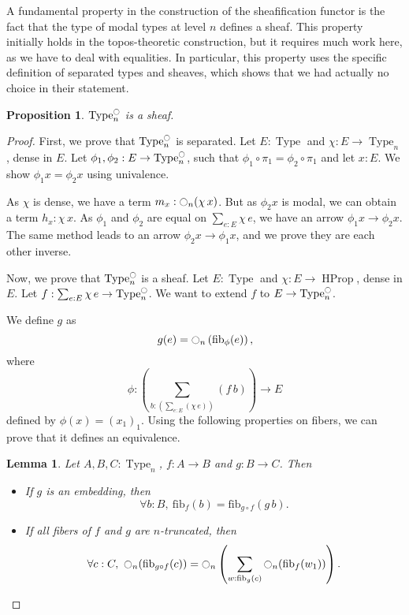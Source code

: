 \documentclass[conference]{IEEEtran}
\newtheorem{prop}[thm]{Proposition}
\newtheorem{lem}[thm]{Lemma}
\DeclareMathOperator{\Type}{Type}
\DeclareMathOperator{\HProp}{HProp}
\newcommand{\modal}{\ensuremath{\ocircle}}
\newcommand \fib[2] {\mathrm{fib}_{#1}(#2)}
\begin{document}
A fundamental property in the construction of the sheafification
functor is the fact that the type of modal types at level $n$ defines
a sheaf.
%
This property initially holds in the topos-theoretic construction, but
it requires much work here, as we have to deal with equalities. In
particular, this property uses the specific definition
of separated types and sheaves, which shows that we had actually no
choice in their statement. 


\begin{prop}\label{prop:sheaf-is-sheaf}
  $\Type_n^\modal$ is a sheaf.
\end{prop}
\begin{proof}
  First, we prove that $\Type_n^\modal$ is separated. Let $E:\Type$
  and $\chi:E \to \Type_n$, dense in $E$. Let $\phi_1,\phi_2:E \to
  \Type_n^\modal$, such that $\phi_1 \circ \pi_1 = \phi_2 \circ
  \pi_1$ and let $x:E$. We show $\phi_1 x = \phi_2 x$ using
  univalence.

  As $\chi$ is dense, we have a term $m_x : \modal_n(\chi\, x)$.
  But as $\phi_2 x$ is modal, we can obtain a term $h_x : \chi\,
  x$. 
  As $\phi_1$ and $\phi_2$ are equal on $\sum_{e:E}\chi\, e$, we
  have an arrow $\phi_1 x \to \phi_2 x$.
  The same method leads to an arrow $\phi_2 x \to \phi_1 x$, and we
  prove they are each other inverse.

  Now, we prove that $\Type_n^\modal$ is a sheaf. Let $E:\Type$ and
  $\chi:E \to \HProp$, dense in $E$. Let $f:\sum_{e:E} \chi\, e \to
  \Type_n^\modal$. We want to extend $f$ to $E \to \Type_n^\modal$.

  We define $g$ as 
  $$g(e) = \modal_n \left( \fib \phi e \right), $$
  where
  $$\phi : \left(\sum_{b:\left(\sum_{e:E} (\chi\, e)\right)} (f\,
    b)\right) \to E$$
  defined by $\phi(x) = (x_1)_1$.
  Using the following properties on fibers, we can prove that it
  defines an equivalence.
  \begin{lem}
    Let $A,B,C:\Type_n$, $f:A\to B$ and $g:B\to C$.
    Then
    \begin{itemize}
    \item If $g$ is an embedding, then 
      $$\forall b:B,~\fib f b = \fib {g\circ f} {g\, b}.$$
    \item If all fibers of $f$ and $g$ are $n$-truncated, then
      $$\forall c:C,~\modal_n(\fib {g \circ f} c) =
      \modal_n \left(  
        \sum_{w:\fib g c} \modal_n (\fib f {w_1})
      \right).$$
    \end{itemize}
  \end{lem}

\end{proof}
\end{document}
